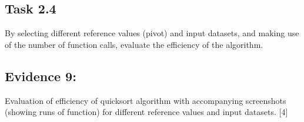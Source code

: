 \subsection*{Task 2.4 }

By selecting different reference values (pivot) and input datasets,
and making use of the number of function calls, evaluate the efficiency
of the algorithm. 

\subsection*{Evidence 9: }

Evaluation of efficiency of quicksort algorithm with accompanying
screenshots (showing runs of function) for different reference values
and input datasets.\hfill{} {[}4{]}